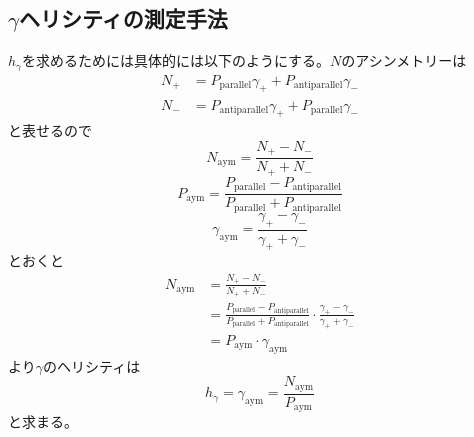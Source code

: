 \documentclass[dvipdfmx]{jreport}
\begin{document}
\subsection{\texorpdfstring{$\gamma$}線ヘリシティの測定手法}
$h_{\gamma}$を求めるためには具体的には以下のようにする。$N$のアシンメトリーは
\begin{equation}
  \begin{split}
  N_{+} &= P_{\mathrm{parallel}}\gamma_{+} + P_{\mathrm{anti parallel}}\gamma_{-}\\
  N_{-} &= P_{\mathrm{anti parallel}}\gamma_{+} + P_{\mathrm{parallel}}\gamma_{-}
  \end{split}
\end{equation}
と表せるので
\begin{equation}
  N_{\mathrm{aym}} = \frac{N_{+} - N_{-}}{N_{+} + N_{-}}
\end{equation}
\begin{equation}
  P_{\mathrm{aym}} = \frac{P_{\mathrm{parallel}} - P_{\mathrm{anti parallel}}}{P_{\mathrm{parallel}} + P_{\mathrm{anti parallel}}}
\end{equation}
\begin{equation}
\gamma_{\mathrm{aym}} = \frac{\gamma_{+} - \gamma_{-}}{\gamma_{+} + \gamma_{-}}  
\end{equation}
とおくと
\begin{equation}
  \begin{split}
  N_{\mathrm{aym}} &= \frac{N_{+} - N_{-}}{N_{+} + N_{-}}\\
  &= \frac{P_{\mathrm{parallel}} - P_{\mathrm{anti parallel}}}{P_{\mathrm{parallel}} + P_{\mathrm{anti parallel}}} \cdot \frac{\gamma_{+} - \gamma_{-}}{\gamma_{+} + \gamma_{-}}\\
  &= P_{\mathrm{aym}} \cdot \gamma_{\mathrm{aym}}
  \end{split}
\end{equation}
より$\gamma$のヘリシティは
\begin{equation}
  h_{\gamma} = \gamma_{\mathrm{aym}} = \frac{N_{\mathrm{aym}}}{P_{\mathrm{aym}}}
\end{equation}
と求まる。
\end{document}
